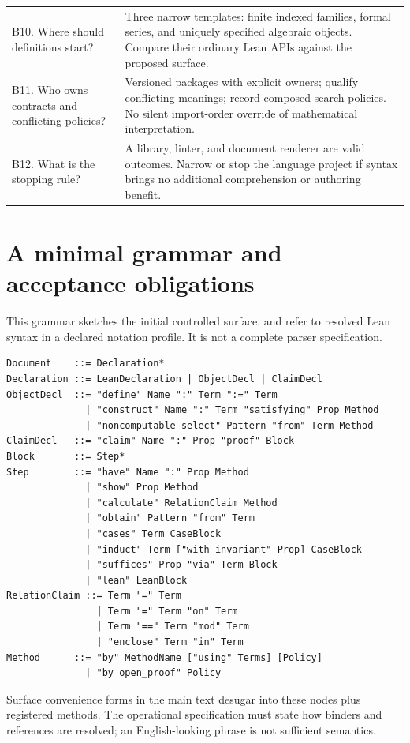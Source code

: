 \documentclass[11pt,a4paper]{article}
\newcommand{\code}[1]{\texttt{\detokenize{#1}}}
\theoremstyle{remark}\newtheorem{example}[proposition]{Example}
\begin{document}
\begin{longtable}{@{}P{.34\textwidth}P{.58\textwidth}@{}}
B10. Where should definitions start? & Three narrow templates: finite indexed families, formal series, and uniquely specified algebraic objects. Compare their ordinary Lean APIs against the proposed surface.\\
B11. Who owns contracts and conflicting policies? & Versioned packages with explicit owners; qualify conflicting meanings; record composed search policies. No silent import-order override of mathematical interpretation.\\
B12. What is the stopping rule? & A library, linter, and document renderer are valid outcomes. Narrow or stop the language project if syntax brings no additional comprehension or authoring benefit.\\
\bottomrule
\end{longtable}
\endgroup

\section{A minimal grammar and acceptance obligations}\label{app:grammar}
This grammar sketches the initial controlled surface. \code{Term} and \code{Prop} refer to resolved Lean syntax in a declared notation profile. It is not a complete parser specification.
\begin{lstlisting}
Document    ::= Declaration*
Declaration ::= LeanDeclaration | ObjectDecl | ClaimDecl
ObjectDecl  ::= "define" Name ":" Term ":=" Term
              | "construct" Name ":" Term "satisfying" Prop Method
              | "noncomputable select" Pattern "from" Term Method
ClaimDecl   ::= "claim" Name ":" Prop "proof" Block
Block       ::= Step*
Step        ::= "have" Name ":" Prop Method
              | "show" Prop Method
              | "calculate" RelationClaim Method
              | "obtain" Pattern "from" Term
              | "cases" Term CaseBlock
              | "induct" Term ["with invariant" Prop] CaseBlock
              | "suffices" Prop "via" Term Block
              | "lean" LeanBlock
RelationClaim ::= Term "=" Term
                | Term "=" Term "on" Term
                | Term "==" Term "mod" Term
                | "enclose" Term "in" Term
Method      ::= "by" MethodName ["using" Terms] [Policy]
              | "by open_proof" Policy
\end{lstlisting}
Surface convenience forms in the main text desugar into these nodes plus registered methods. The operational specification must state how binders and references are resolved; an English-looking phrase is not sufficient semantics.
\end{document}
